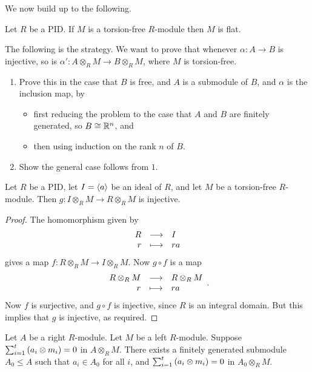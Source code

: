 \pagebreak

We now build up to the following.

\begin{proposition}
\label{prop:torsionflat}
Let $ R $ be a PID. If $ M $ is a torsion-free $ R $-module then $ M $ is flat.
\end{proposition}

The following is the strategy. We want to prove that whenever $ \alpha : A \to B $ is injective, so is $ \alpha' : A \otimes_R M \to B \otimes_R M $, where $ M $ is torsion-free.
\begin{enumerate}
\item Prove this in the case that $ B $ is free, and $ A $ is a submodule of $ B $, and $ \alpha $ is the inclusion map, by
\begin{itemize}
\item first reducing the problem to the case that $ A $ and $ B $ are finitely generated, so $ B \cong \mathbb{R}^n $, and
\item then using induction on the rank $ n $ of $ B $.
\end{itemize}
\item Show the general case follows from $ 1 $.
\end{enumerate}

\begin{lemma}
\label{lem:torsionflat1}
Let $ R $ be a PID, let $ I = \left\langle a \right\rangle $ be an ideal of $ R $, and let $ M $ be a torsion-free $ R $-module. Then $ g : I \otimes_R M \to R \otimes_R M $ is injective.
\end{lemma}

\begin{proof}
The homomorphism given by
$$ \function{R}{I}{r}{ra} $$
gives a map $ f : R \otimes_R M \to I \otimes_R M $. Now $ g \circ f $ is a map
$$ \function{R \otimes_R M}{R \otimes_R M}{r}{ra}. $$
Now $ f $ is surjective, and $ g \circ f $ is injective, since $ R $ is an integral domain. But this implies that $ g $ is injective, as required.
\end{proof}

\begin{lemma}
\label{lem:torsionflat2}
Let $ A $ be a right $ R $-module. Let $ M $ be a left $ R $-module. Suppose $ \sum_{i = 1}^t \br{a_i \otimes m_i} = 0 $ in $ A \otimes_R M $. There exists a finitely generated submodule $ A_0 \le A $ such that $ a_i \in A_0 $ for all $ i $, and $ \sum_{i = 1}^t \br{a_i \otimes m_i} = 0 $ in $ A_0 \otimes_R M $.
\end{lemma}

